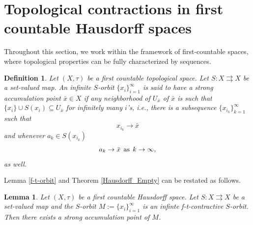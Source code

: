 \documentclass{article}
\renewcommand{\emptyset}{\varnothing}
\def\text#1{\,\;\hbox{#1}\;\,}
\newtheorem{defi}[theo]{Definition}
\newtheorem{rem}[theo]{Remark}
\newtheorem{lemma}[theo]{Lemma}
\begin{document}


\section{Topological contractions in first countable Hausdorff spaces}



Throughout this section, we work within the framework of first-countable spaces, where topological properties can be fully characterized by sequences. 

\begin{defi} \label{strong_acc_point}
Let $(X, \tau)$ be a first countable topological space. Let $S:X \rightrightarrows X$ be a set-valued map. An infinite $S$-orbit $\{x_i\}_{i = 1}^{\infty}$ is said to have a strong accumulation point $\bar{x} \in X$ if any neighborhood of $U_{\bar{x}}$ of $\bar{x}$ is such that $\{x_i\} \cup S(x_i) \subseteq U_{\bar{x}}$ for infinitely many $i$'s, i.e., there is a subsequence $\{x_{i_k}\}_{k= 1}^{\infty}$ such that
 \[x_{i_k} \rightarrow \bar{x}\] 
 and whenever $a_k \in S(x_{i_k})$
 \[a_k \rightarrow \bar{x} \text{as} k \rightarrow \infty,\]
 as well. 
\end{defi}
Lemma \ref{f-t-orbit} and Theorem \ref{Hausdorff_Empty} can be restated as follows.
\begin{lemma} \label{conv_o_orbital}
 Let $(X, \tau)$ be a first countable Hausdorff space. Let $S: X \rightrightarrows X$ be a set-valued map and the $S$-orbit $M:=\{x_i\}_{i=1}^{\infty}$ is an infinte f-t-contractive $S$-orbit. Then there exists a strong accumulation point of $M$.
\end{lemma} 
\end{document}
